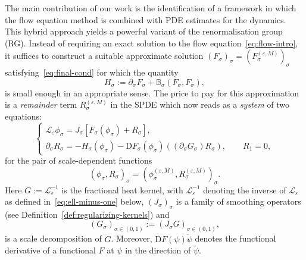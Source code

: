 \documentclass{article}
\numberwithin{equation}{section}
\newcommand{\assign}{:=}
\newcommand{\mathD}{\mathrm{D}}
\theoremstyle{plain}
\theoremstyle{definition}
\begin{document}
The main contribution of our work is the identification of a framework in
which the flow equation method is combined with PDE estimates for the
dynamics. This hybrid approach yields a powerful variant of the
renormalisation group (RG). Instead of requiring an exact solution to the flow
equation~\eqref{eq:flow-intro}, it suffices to construct a suitable
approximate solution $(F_{\sigma} )_{\sigma} = (F_{\sigma}^{(\varepsilon,
M)})_{\sigma}$ satisfying~\eqref{eq:final-cond} for which the quantity
\begin{equation}
  H_{\sigma} \assign \partial_{\sigma} F_{\sigma}  +\mathbb{B}_{\sigma}
  (F_{\sigma} , F_{\sigma} ), \label{eq:approx-flow}
\end{equation}
is small enough in an appropriate sense. The price to pay for this
approximation is a \textit{remainder} term $R^{(\varepsilon, M)}_{\sigma}$
in the SPDE which now reads as a \textit{system} of two equations:
\begin{equation}
  \left\{\begin{array}{l}
    \mathcal{L}_{\varepsilon} \phi _{\sigma} = J_{\sigma} [F_{\sigma}  (\phi
    _{\sigma}) + R_{\sigma} ],\\
    \partial_{\sigma} R_{\sigma}  = -H_{\sigma}  (\phi _{\sigma}) - \mathD
    F_{\sigma}  (\phi _{\sigma}) ((\partial_{\sigma} G _{\sigma}) R_{\sigma}
    ), \qquad R_1  = 0,
  \end{array}\right.  \label{eq:effective-spde-remainder}
\end{equation}
for the pair of scale-dependent functions
\[ (\phi _{\sigma}, R _{\sigma})_{\sigma} = (\phi^{(\varepsilon, M)}_{\sigma},
   R^{(\varepsilon, M)}_{\sigma})_{\sigma} . \]
Here $G  \assign \mathcal{L}_{\varepsilon}^{- 1}$ is the fractional heat
kernel, with $\mathcal{L}_{\varepsilon}^{- 1}$ denoting the inverse of
$\mathcal{L}_{\varepsilon}$ as defined in~\eqref{eq:ell-minus-one} below,
$(J_{\sigma})_{\sigma}$ is a family of smoothing operators (see
Definition~\ref{def:regularizing-kernels}) and
\[ (G _{\sigma})_{\sigma \in (0, 1)} \assign (J_{\sigma} G)_{\sigma \in (0,
   1)} , \]
is a scale decomposition of $G$. Moreover, $\mathD F  (\psi) \tilde{\psi}$
denotes the functional derivative of a functional $F$ at $\psi$ in the
direction of $\tilde{\psi}$.
\end{document}
